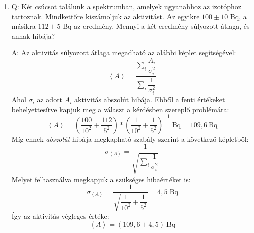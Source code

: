 \begin{enumerate}
    \item Q: Két csúcsot találunk a spektrumban, amelyek ugyanahhoz az izotóphoz tartoznak. Mindkettőre kiszámoljuk az aktivitást. Az egyikre $100 \pm 10$ Bq, a másikra $112 \pm 5$ Bq az eredmény. Mennyi a két eredmény súlyozott átlaga, és annak hibája?
    \begin{displayquote}
        A: Az aktivitás súlyozott átlaga megadható az alábbi képlet segítségével:
        \begin{equation}
            \left< A \right>
            =
            \frac{\sum_{i} \dfrac{A_{i}}{\sigma_{i}^{2}}}{\sum_{i} \dfrac{1}{\sigma_{i}^{2}}}
        \end{equation}
        Ahol $\sigma_{i}$ az adott $A_{i}$ aktivitás abszolút hibája. Ebből a fenti értékeket behelyettesítve kapjuk meg a választ a kérdésben szereplő problémára:
        \begin{equation}
            \left< A \right>
            =
            \left( \frac{100}{10^{2}} + \frac{112}{5^{2}} \right)
            *
            \left( \frac{1}{10^{2}} + \frac{1}{5^{2}} \right)^{-1}\ \text{Bq}
            =
            109,6\ \text{Bq}
        \end{equation}
        Míg ennek \emph{abszolút} hibája megkapható szabály szerint a következő képletből:
        \begin{equation}
            \sigma_{\left< A \right>}
            =
            \frac{1}{\sqrt{\sum_{i} \dfrac{1}{\sigma_{i}^{2}}}}
        \end{equation}
        Melyet felhasználva megkapjuk a szükséges hibaértéket is:
        \begin{equation}
            \sigma_{\left< A \right>}
            =
            \frac{1}{\sqrt{\dfrac{1}{10^{2}} + \dfrac{1}{5^{2}}}}
            =
            4,5\ \text{Bq}
        \end{equation}
        Így az aktivitás végleges értéke:
        \begin{equation*}
            \left< A \right>
            =
            \left(109,6 \pm 4,5 \right)\ \text{Bq}
        \end{equation*}
    \end{displayquote}
    

\end{enumerate}
